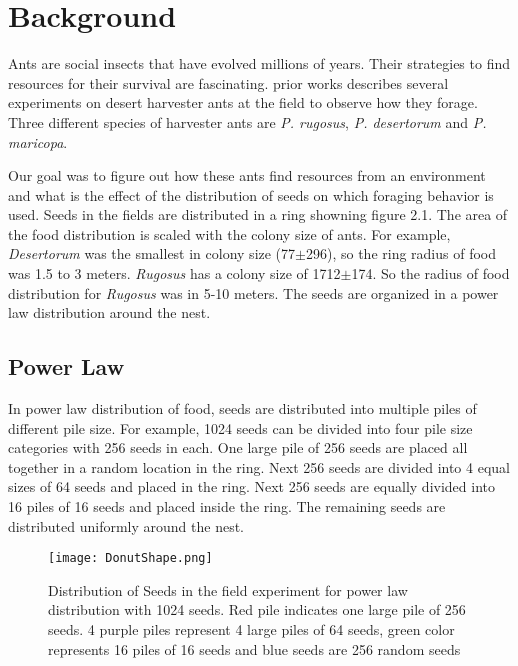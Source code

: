 \chapter{Background}
Ants are social insects that have evolved millions of years. Their strategies to find resources for their survival are fascinating. prior works describes several experiments on desert harvester ants at the field to observe how they forage\cite{flanagan2012quantifying}. Three different species of harvester ants are \textit{P. rugosus}, \textit{P. desertorum} and \textit{P. maricopa}.\par
Our goal was to figure out how these ants find resources from an environment and what is the effect of the distribution of seeds on which foraging behavior is used. Seeds in the fields are distributed in a  ring showning figure 2.1. The area of the food distribution is scaled with the colony size of ants. For example, \textit{Desertorum} was the smallest in colony size (77$\pm$296), so the  ring radius of food was 1.5 to 3 meters. \textit{Rugosus} has a colony size of 1712$\pm$174. So the radius of food distribution for \textit{Rugosus} was in 5-10 meters. The seeds are organized in a power law distribution around the nest.
\section{\label{section:Power Law}Power Law}
In power law distribution of food, seeds are distributed into multiple piles of different pile size. For example, 1024 seeds can be divided into four pile size categories with 256 seeds in each. One large pile of 256 seeds are placed all together in a random location in the ring. Next 256 seeds are divided into 4 equal sizes of 64 seeds and placed in the ring. Next 256 seeds are equally divided into 16 piles of 16 seeds and placed inside the ring. The remaining seeds are distributed uniformly around the nest.
\begin{figure}[h]
	\texttt{[image: DonutShape.png]}
	\caption{Distribution of Seeds in the field experiment for power law distribution with 1024 seeds. Red pile indicates one large pile of 256 seeds. 4 purple piles represent 4 large piles of 64 seeds, green color represents 16 piles of 16 seeds and blue seeds are 256 random seeds}
\end{figure}
